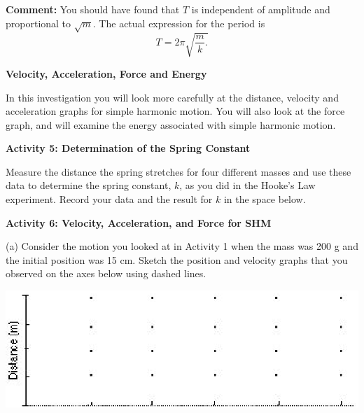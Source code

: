 \textbf{Comment:} You should have found that $T$ is independent of amplitude 
and proportional to \( \sqrt{m} \). The actual expression for the period is
\[T=2\pi \sqrt{\frac{m}{k}.}\]


\textbf{Velocity, Acceleration, Force and Energy }

In this investigation you will look more carefully at the distance, velocity
and acceleration graphs for simple harmonic motion. You will also look at the
force graph, and will examine the energy associated with simple harmonic motion.

\textbf{Activity 5: Determination of the Spring Constant }

Measure the distance the spring stretches for four different masses and use
these data to determine the spring constant, $k$, as you did in the Hooke's Law experiment. Record your data and the result for $k$ in the space below.
\answerspace{40mm}

\textbf{Activity 6: Velocity, Acceleration, and Force for SHM} 

(a) Consider the motion you looked at in Activity 1 when the mass was 200 g
and the initial position was 15 cm. Sketch the position and velocity graphs
that you observed on the axes below using dashed lines.

\vspace{0.3cm}
{\par\centering \includegraphics{periodic_motion/periodic_motion_fig2.eps} \par}
\vspace{0.3cm}

